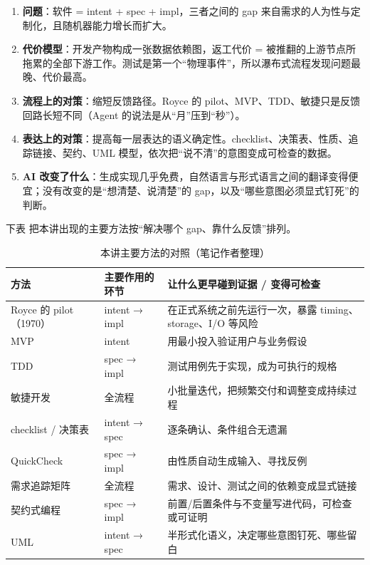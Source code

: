 \documentclass[a4paper]{article}
\begin{document}
\begin{enumerate}
  \item \textbf{问题}：软件 = intent + spec + impl，三者之间的 gap 来自需求的人为性与定制化，且随机器能力增长而扩大。
  \item \textbf{代价模型}：开发产物构成一张数据依赖图，返工代价 = 被推翻的上游节点所拖累的全部下游工作。测试是第一个“物理事件”，所以瀑布式流程发现问题最晚、代价最高。
  \item \textbf{流程上的对策}：缩短反馈路径。Royce 的 pilot、MVP、TDD、敏捷只是反馈回路长短不同（Agent 的说法是从“月”压到“秒”）。
  \item \textbf{表达上的对策}：提高每一层表达的语义确定性。checklist、决策表、性质、追踪链接、契约、UML 模型，依次把“说不清”的意图变成可检查的数据。
  \item \textbf{AI 改变了什么}：生成实现几乎免费，自然语言与形式语言之间的翻译变得便宜；没有改变的是“想清楚、说清楚”的 gap，以及“哪些意图必须显式钉死”的判断。
\end{enumerate}

下表 把本讲出现的主要方法按“解决哪个 gap、靠什么反馈”排列。

\begin{table}[H]
\centering
\small
\begin{tabular}{p{}p{}p{}}
\toprule
方法 & 主要作用的环节 & 让什么更早碰到证据 / 变得可检查 \\
\midrule
Royce 的 pilot（1970） & intent → impl & 在正式系统之前先运行一次，暴露 timing、storage、I/O 等风险 \\
MVP & intent & 用最小投入验证用户与业务假设 \\
TDD & spec → impl & 测试用例先于实现，成为可执行的规格 \\
敏捷开发 & 全流程 & 小批量迭代，把频繁交付和调整变成持续过程 \\
checklist / 决策表 & intent → spec & 逐条确认、条件组合无遗漏 \\
QuickCheck & spec → impl & 由性质自动生成输入、寻找反例 \\
需求追踪矩阵 & 全流程 & 需求、设计、测试之间的依赖变成显式链接 \\
契约式编程 & spec → impl & 前置/后置条件与不变量写进代码，可检查或可证明 \\
UML & intent → spec & 半形式化语义，决定哪些意图钉死、哪些留白 \\
\bottomrule
\end{tabular}
\caption{本讲主要方法的对照（笔记作者整理）}
\label{tab:summary}
\end{table}
\end{document}

